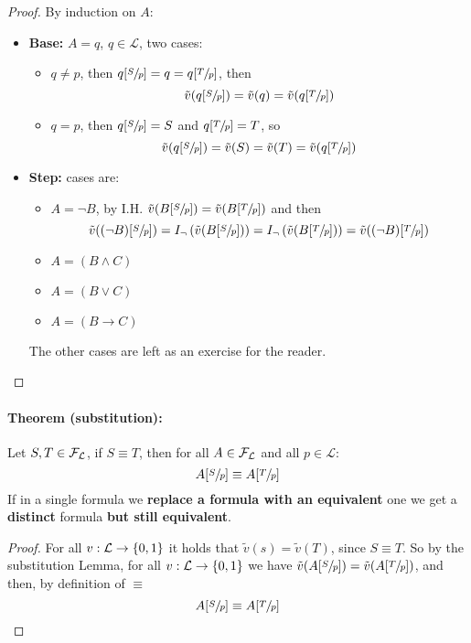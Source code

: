 	\begin{proof}
		By induction on $A$:
		\begin{itemize}
			\item \textbf{Base:} $A = q$, $q \in \mathcal{L}$, two cases:
			\begin{itemize}
				\item $q \neq p$, then $q [\sfrac{S}{p}] = q = q [\sfrac{T}{p}]$, then
				$$\tilde{v}(q[\sfrac{S}{p}]) = \tilde{v}(q) = \tilde{v} (q[\sfrac{T}{p}])$$

				\item $q = p$, then $q[\sfrac{S}{p}] = S$ and $q[\sfrac{T}{p}] = T$, so
				$$ \tilde{v} (q [\sfrac{S}{p}]) = \tilde{v} (S) = \tilde{v} (T) = \tilde{v} (q[\sfrac{T}{p}]) $$
			\end{itemize}

			\item \textbf{Step:} cases are:
			\begin{itemize}
				\item $A = \neg B$, by I.H. $\tilde{v} (B [\sfrac{S}{p}]) = \tilde{v} (B [\sfrac{T}{p}])$ and then
				$$ \tilde{v} ((\neg B) [\sfrac{S}{p}])  = I_\neg \left(\tilde{v} (B [\sfrac{S}{p}])\right) = I_\neg \left(\tilde{v} (B [\sfrac{T}{p}])\right) = \tilde{v} ((\neg B) [\sfrac{T}{p}])$$
				\item $A = (B \wedge C)$
				\item $A = (B \vee C)$
				\item $A = (B \rightarrow C)$
			\end{itemize}
			The other cases are left as an exercise for the reader.\\
		\end{itemize}
	\end{proof}

	\paragraph{Theorem (substitution):} Let $S, T \in \mathcal{F}_\mathcal{L}$, if $S \equiv T$, then for all $A \in \mathcal{F}_\mathcal{L}$ and all $p \in \mathcal{L}$:
	$$ A[\sfrac{S}{p}] \equiv A[\sfrac{T}{p}] $$
	If in a single formula we \textbf{replace a formula with an equivalent} one we get a \textbf{distinct} formula \textbf{but still equivalent}.\\

	\begin{proof}
		For all $v: \mathcal{L} \rightarrow \{0,1\}$ it holds that $\tilde{v} (s) = \tilde{v} (T)$, since $S \equiv T$. So by the substitution Lemma, for all $v: \mathcal{L} \rightarrow \{0,1\}$ we have $\tilde{v} (A [\sfrac{S}{p}]) = \tilde{v} (A[\sfrac{T}{p}])$, and then, by definition of $\equiv$
		$$ A[\sfrac{S}{p}] \equiv A[\sfrac{T}{p}] $$
	\end{proof}

